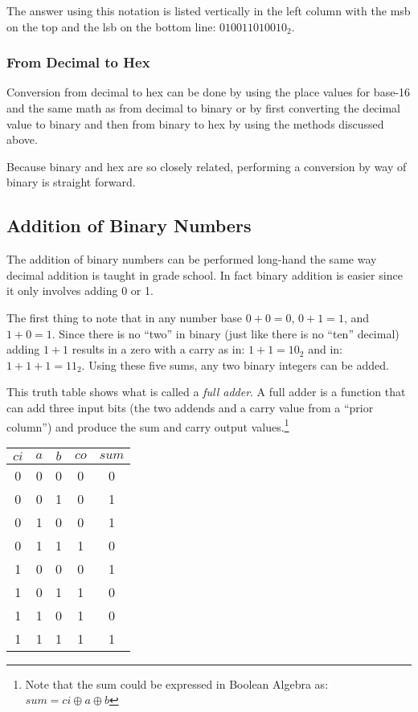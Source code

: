 The answer using this notation is listed vertically
in the left column with the \acrshort{msb} on the top and 
the \acrshort{lsb} on the bottom line: $010011010010_2$.


\subsubsection{From Decimal to Hex}

Conversion from decimal to hex can be done by using the place
values for base-16 and the same math as from decimal to binary
or by first converting the decimal value to binary and then
from binary to hex by using the methods discussed above.

Because binary and hex are so closely related, performing
a conversion by way of binary is straight forward.


\subsection{Addition of Binary Numbers}

The addition of binary numbers can be performed long-hand the
same way decimal addition is taught in grade school.  In fact binary
addition is easier since it only involves adding 0 or 1.

The first thing to note that in any number base $0+0=0$, $0+1=1$, and 
$1+0=1$.  Since there is no ``two'' in binary (just like there is 
no ``ten'' decimal) adding $1+1$ results in a zero with a carry as
in: $1+1=10_2$ and in: $1+1+1=11_2$.  Using these five sums, any two
binary integers can be added.

%
This truth table shows what is called a {\em full adder}.
A full adder is a function that can add three input bits 
(the two addends and a carry value from a ``prior column'')
and produce the sum and carry output values.\footnote{
Note that the sum could be expressed in Boolean Algebra as:
$sum = ci \oplus{} a \oplus{} b$}

\begin{center}
\begin{tabular}{|ccc|cc|}
\hline
$ci$ & $a$ & $b$ & $co$ & $sum$\\
\hline
 0 & 0 & 0 &   0 & 0 \\
 0 & 0 & 1 &   0 & 1 \\
 0 & 1 & 0 &   0 & 1 \\
 0 & 1 & 1 &   1 & 0 \\
 1 & 0 & 0 &   0 & 1 \\
 1 & 0 & 1 &   1 & 0 \\
 1 & 1 & 0 &   1 & 0 \\
 1 & 1 & 1 &   1 & 1 \\
\hline
\end{tabular}
\end{center}

